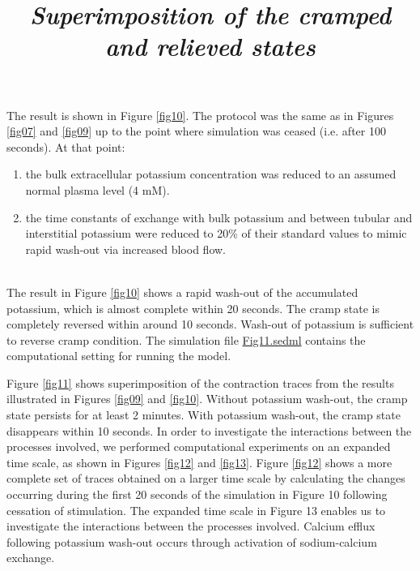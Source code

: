 \documentclass[fleqn,10pt]{physiome}
\begin{document}
The result is shown in Figure \ref{fig10}. The protocol was the same as in Figures \ref{fig07} and \ref{fig09} up to the point where simulation was ceased (i.e. after 100 seconds). At that point:
\renewcommand{\labelenumi}{(\alph{enumi})}
\begin{enumerate}
     \item the bulk extracellular potassium concentration was reduced to an assumed normal plasma level (4 mM). 
     \item the time constants of exchange with bulk potassium and between tubular and interstitial potassium were reduced to 20\% of their standard values to mimic rapid wash-out via increased blood flow.
\end{enumerate}\\\newline 
The result in Figure \ref{fig10} shows a rapid wash-out of the accumulated potassium, which is almost complete within 20 seconds. The cramp state is completely reversed within around 10 seconds. Wash-out of potassium is sufficient to reverse cramp condition. The simulation file \href{http://models.cellml.org/workspace/5f4/file/099d70c2ee6ed5dfb1ca33e0ce16db4f0247a4dc/Fig11.sedml}{Fig11.sedml} contains the computational setting for running the model.\\


\title{\textit{Superimposition of the cramped and relieved states}}\newline


Figure \ref{fig11} shows superimposition of the contraction traces from the results illustrated in Figures \ref{fig09} and \ref{fig10}. Without potassium wash-out, the cramp state persists for at least 2 minutes. With potassium wash-out, the cramp state disappears within 10 seconds. In order to investigate the interactions between the processes involved, we performed computational experiments on an expanded time scale, as shown in Figures \ref{fig12} and \ref{fig13}. Figure \ref{fig12} shows a more complete set of traces obtained on a larger time scale by calculating the changes occurring during the first 20 seconds of the simulation in Figure 10 following cessation of stimulation. The expanded time scale in Figure 13 enables us to investigate the interactions between the processes involved. Calcium efflux following potassium wash-out occurs through activation of sodium-calcium exchange.\\
\end{document}
